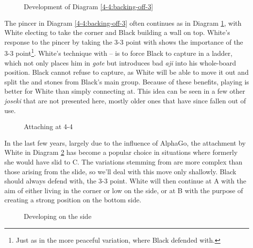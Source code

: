 \documentclass[a5paper,12pt,twoside]{book} %
\newcounter{joseki}                 %
\newcommand{\dref}[1]{Diagram \ref{#1}}
\begin{document}
\begin{figure}[!htbp]
 
\vspace{-0.6cm}\caption{Development of \dref{4-4:backing-off-3}}
\label{4-4:backing-off-4}
\end{figure}

The pincer in \dref{4-4:backing-off-3} often continues as in \dref{4-4:backing-off-4}, with White electing to take the corner and Black building a wall on top. White's response to the pincer by taking the 3-3 point with{\large\whitestone[5]} shows the importance of the 3-3 point\footnote{Just as in the more peaceful variation, where Black defended with{\large\blackstone[4]}.}. White's technique with{\large\whitestone[9]} –{\large\blackstone[12]} is to force Black to capture{\large\whitestone[9]} in a ladder, which not only places him in \textit{gote} but introduces bad \textit{aji} into his whole-board position. Black cannot refuse to capture{\large\whitestone[9]}, as White will be able to move it out and split the{\large\blackstone[4]} and{\large\blackstone[10]} stones from Black's main group. Because of these benefits, playing{\large\whitestone[9]} is better for White than simply connecting at{\large\whitestone[11]}. This idea can be seen in a few other \textit{joseki} that are not presented here, mostly older ones that have since fallen out of use.\\

\begin{figure}[!htbp]
 
\vspace{-0.6cm}\caption{Attaching at 4-4}
\label{4-4:backing-off-5}
\end{figure}

In the last few years, largely due to the influence of AlphaGo, the attachment by White in \dref{4-4:backing-off-5} has become a popular choice in situations where formerly she would have slid to C. The variations stemming from{\large\whitestone[3]} are more complex than those arising from the slide, so we'll deal with this move only shallowly. Black should always defend with{\large\blackstone[4]}, the 3-3 point. White will then continue at A with the aim of either living in the corner or low on the side, or at B with the purpose of creating a strong position on the bottom side.\\

\begin{figure}[!htbp]
 
\vspace{-0.6cm}\caption{Developing on the side}
\label{4-4:backing-off-6}
\end{figure}
\end{document}
